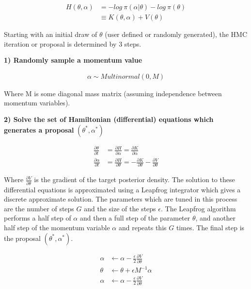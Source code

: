 \documentclass[12pt, a4paper]{article}
\begin{document}
$$
\begin{aligned}
H(\theta, \alpha) &= - log \: \pi(\alpha | \theta) - log \: \pi(\theta) \\ 
&\equiv  K(\theta, \alpha) + V(\theta)
\end{aligned}
$$

 Starting with an initial draw of $\theta$ (user defined or randomly generated), the HMC iteration or proposal is determined by 3 steps.

\textbf{1) Randomly sample a momentum value}

$$
\begin{aligned}
\alpha\sim Multinormal(0, M)
\end{aligned}
$$

Where M is some diagonal mass matrix (assuming independence between momentum variables).

\textbf{2) Solve the set of Hamiltonian (differential) equations which generates a proposal} $(\theta^{\ast}, \alpha^{\ast})$

$$
\begin{aligned}
\frac{\partial \theta}{\partial t} &= \frac{\partial H}{\partial \alpha} = \frac{\partial K}{\partial \alpha} \\
\frac{\partial \alpha}{\partial t} &= \frac{\partial H}{\partial \theta} = - \frac{\partial K}{\partial \theta} - \frac{\partial V}        {\partial \theta}
\end{aligned}
$$

Where $\frac{\partial V}{\partial \theta}$ is the gradient of the target posterior density. The solution to these differential equations is approximated using a Leapfrog integrator which gives a discrete approximate solution. The parameters which are tuned in this process are the number of steps $G$ and the size of the steps $\epsilon$. The Leapfrog algorithm performs a half step of $\alpha$ and then a full step of the parameter $\theta$, and another half step of the momentum variable $\alpha$ and repeats this $G$ times. The final step is the proposal $(\theta^{\ast}, \alpha^{\ast})$.

$$
\begin{aligned}
\alpha &\leftarrow \alpha - \frac{\epsilon}{2} \frac{\partial V}{\partial \theta} \\
\theta &\leftarrow \theta + \epsilon M^{-1} \alpha \\
\alpha &\leftarrow \alpha - \frac{\epsilon}{2} \frac{\partial V}{\partial \theta}
\end{aligned}
$$
\end{document}
